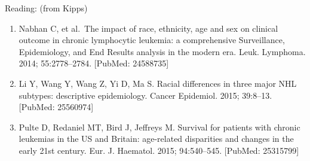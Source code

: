 \documentclass[11pt, a4paper, twosided]{book}
\providecommand{\tightlist}{%
  \setlength{\itemsep}{0pt}\setlength{\parskip}{0pt}}
\begin{document}
Reading:
(from Kipps)
\begin{enumerate}
\def\labelenumi{\arabic{enumi}.}
\setcounter{enumi}{11}
\tightlist
\item
  Nabhan C, et al.~The impact of race, ethnicity, age and sex on clinical outcome in chronic lymphocytic leukemia: a comprehensive Surveillance, Epidemiology, and End Results analysis in the modern era. Leuk. Lymphoma. 2014; 55:2778--2784. {[}PubMed: 24588735{]}
\item
  Li Y, Wang Y, Wang Z, Yi D, Ma S. Racial differences in three major NHL subtypes: descriptive epidemiology. Cancer Epidemiol. 2015; 39:8--13. {[}PubMed: 25560974{]}
\item
  Pulte D, Redaniel MT, Bird J, Jeffreys M. Survival for patients with chronic leukemias in the US and Britain: age-related disparities and changes in the early 21st century. Eur. J. Haematol. 2015; 94:540--545. {[}PubMed: 25315799{]}
\end{enumerate}
\end{document}
